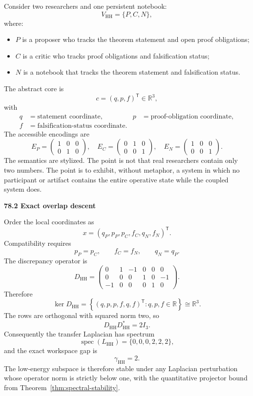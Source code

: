 \documentclass[11pt,letterpaper]{article}
\DeclareMathOperator{\spec}{spec}
\newcommand{\subtopic}[1]{%
 \vspace{0.45em}
 {\bfseries\color{AccentColor} #1\par}
}
\theoremstyle{plain}
\theoremstyle{definition}
\begin{document}
Consider two researchers and one persistent notebook:
\[
V_{\mathrm{HH}}=\{P,C,N\},
\]
where:
\begin{itemize}
\item \(P\) is a proposer who tracks the theorem statement and open proof
 obligations;
\item \(C\) is a critic who tracks proof obligations and falsification status;
\item \(N\) is a notebook that tracks the theorem statement and falsification
 status.
\end{itemize}
The abstract core is
\[
c=(q,p,f)^{\mathsf T}\in\mathbb R^3,
\]
with
\[
\begin{aligned}
q&=\text{statement coordinate},
&
p&=\text{proof-obligation coordinate},\\
f&=\text{falsification-status coordinate}.
\end{aligned}
\]
The accessible encodings are
\[
E_P=
\begin{pmatrix}
1&0&0\\
0&1&0
\end{pmatrix},
\quad
E_C=
\begin{pmatrix}
0&1&0\\
0&0&1
\end{pmatrix},
\quad
E_N=
\begin{pmatrix}
1&0&0\\
0&0&1
\end{pmatrix}.
\]
The semantics are stylized. The point is not that real researchers contain
only two numbers. The point is to exhibit, without metaphor, a system in which
no participant or artifact contains the entire operative state while the
coupled system does.

\subtopic{78.2 Exact overlap descent}

Order the local coordinates as
\[
x=(q_P,p_P,p_C,f_C,q_N,f_N)^{\mathsf T}.
\]
Compatibility requires
\[
p_P=p_C,
\qquad
f_C=f_N,
\qquad
q_N=q_P.
\]
The discrepancy operator is
\[
D_{\mathrm{HH}}
=
\begin{pmatrix}
0&1&-1&0&0&0\\
0&0&0&1&0&-1\\
-1&0&0&0&1&0
\end{pmatrix}.
\]
Therefore
\[
\ker D_{\mathrm{HH}}
=
\left\{
(q,p,p,f,q,f)^{\mathsf T}:q,p,f\in\mathbb R
\right\}
\cong\mathbb R^3.
\]
The rows are orthogonal with squared norm two, so
\[
D_{\mathrm{HH}}D_{\mathrm{HH}}^*=2I_3.
\]
Consequently the transfer Laplacian has spectrum
\[
\boxed{
\spec(L_{\mathrm{HH}})
=
\{0,0,0,2,2,2\},
}
\]
and the exact workspace gap is
\[
\gamma_{\mathrm{HH}}=2.
\]
The low-energy subspace is therefore stable under any Laplacian perturbation
whose operator norm is strictly below one, with the quantitative projector
bound from Theorem~\ref{thm:spectral-stability}.
\end{document}

